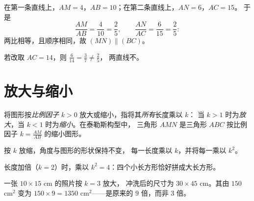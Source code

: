 \begin{example}\label{ex:g9:thales:converse}
在第一条直线上，$AM = 4$，$AB = 10$；在第二条直线上，$AN = 6$，$AC = 15$。
于是
\[
\frac{AM}{AB} = \frac{4}{10} = \frac25,
\qquad
\frac{AN}{AC} = \frac{6}{15} = \frac25 :
\]
两比相等，且顺序相同，故 $(MN) \parallel (BC)$。

若改取 $AC = 14$，则 $\frac{6}{14} = \frac37 \neq \frac25$，
两直线不。
\end{example}

\section{放大与缩小}

\begin{definition}[图形的放缩]\label{def:g9:thales:scaling}
将图形按\emph{比例因子}
$k > 0$ 放大或缩小，指将其\emph{所有}长度乘以 $k$：
当 $k > 1$ 时为\emph{放大}，当
$k < 1$ 时为\emph{缩小}。在泰勒斯构型中，
三角形 $AMN$ 是三角形 $ABC$ 按比例因子 $k = \frac{AM}{AB}$ 的缩小图形。
\end{definition}

\begin{proposition}[对角度与面积的影响]\label{prop:g9:thales:scaling}
按 $k$ 放缩，角度与图形的形状保持不变，
每一长度乘以 $k$，并将每一\emph{}乘以
$k^2$。
\end{proposition}
\admitted

\begin{omfigure}

{\small 长度加倍（$k = 2$）时，乘以
$k^2 = 4$：四个小长方形恰好拼成大长方形。}
\end{omfigure}

\begin{example}
一张 $10 \times 15$ cm 的照片按 $k = 3$ 放大，
冲洗后的尺寸为 $30 \times 45$ cm。其由 $150$ cm$^2$ 变为
$150 \times 9 = 1350$ cm$^2$——是原来的 $9$ 倍，而非 $3$ 倍。
\end{example}

